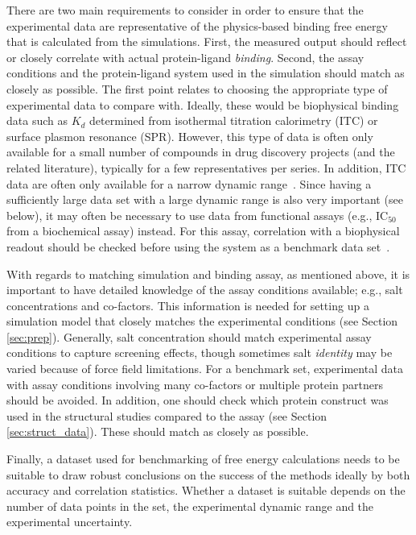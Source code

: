 \documentclass[9pt,bestpractices]{livecoms}
\begin{document}
There are two main requirements to consider in order to ensure that the experimental data are representative of the physics-based binding free energy that is calculated from the simulations. First, the measured output should reflect or closely correlate with actual protein-ligand \emph{binding}. Second, the assay conditions and the protein-ligand system used in the simulation should match as closely as possible. The first point relates to choosing the appropriate type of experimental data to compare with. Ideally, these would be biophysical binding data such as $K_d$ determined from isothermal titration calorimetry (ITC) or surface plasmon resonance (SPR). However, this type of data is often only available for a small number of compounds in drug discovery projects (and the related literature), typically for a few representatives per series. In addition, ITC data are often only available for a narrow dynamic range~\cite{wiseman_rapid_1989,chodera_entropyenthalpy_2013}. Since having a sufficiently large data set with a large dynamic range is also very important (see below), it may often be necessary to use data from functional assays (e.g., IC$_{50}$ from a biochemical assay) instead. For this assay, correlation with a biophysical readout should be checked before using the system as a benchmark data set~\cite{kalliokoski_comparability_2013}.

With regards to matching simulation and binding assay, as mentioned above, it is important to have detailed knowledge of the assay conditions available; e.g., salt concentrations and co-factors. This information is needed for setting up a simulation model that closely matches the experimental conditions (see Section \ref{sec:prep}). Generally, salt concentration should match experimental assay conditions to capture screening effects, though sometimes salt \emph{identity} may be varied because of force field limitations. For a benchmark set, experimental data with assay conditions involving many co-factors or multiple protein partners should be avoided. In addition, one should check which protein construct was used in the structural studies compared to the assay (see Section \ref{sec:struct_data}). These should match as closely as possible. 

Finally, a dataset used for benchmarking of free energy calculations needs to be suitable to draw robust conclusions on the success of the methods ideally by both accuracy and correlation statistics. Whether a dataset is suitable depends on the number of data points in the set, the experimental dynamic range and the experimental uncertainty. 
\end{document}
